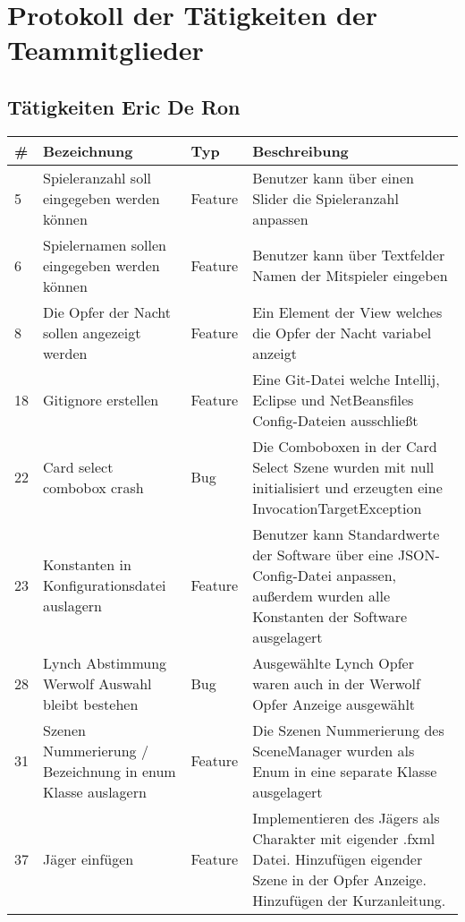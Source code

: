 \chapter{Protokoll der Tätigkeiten der Teammitglieder}

\section{Tätigkeiten Eric De Ron}

\begin{tabularx}{\textwidth}{|l|p{4.5cm}|l|X|}
	\hline                                             %
	\textbf{\#}  &    \textbf{Bezeichnung}  &    \textbf{Typ}  & \textbf{Beschreibung}	 \\ 
	\hline \hline 
	\endhead      
	
	5 \label{iss:5}	&	Spieleranzahl soll eingegeben werden können &	Feature	&	Benutzer kann über einen Slider die Spieleranzahl anpassen  \\ \hline
	6 \label{iss:6}	&	Spielernamen sollen eingegeben werden können    &	Feature	&	Benutzer kann über Textfelder Namen der Mitspieler eingeben  \\ \hline
	8 \label{iss:8}	&	Die Opfer der Nacht sollen angezeigt werden &	Feature	&	Ein Element der View welches die Opfer der Nacht variabel anzeigt  \\ \hline
	18 \label{iss:18}	&	Gitignore erstellen &	Feature	&	Eine Git-Datei welche Intellij, Eclipse und NetBeansfiles Config-Dateien ausschließt  \\ \hline
	22 \label{iss:22}	&	Card select combobox crash  &	Bug	&	Die Comboboxen in der Card Select Szene wurden mit null initialisiert und erzeugten eine InvocationTargetException  \\ \hline
	23 \label{iss:23}	&	Konstanten in Konfigurationsdatei auslagern &	Feature	&	Benutzer kann Standardwerte der Software über eine JSON-Config-Datei anpassen, außerdem wurden alle Konstanten der Software ausgelagert  \\ \hline
	28 \label{iss:28}	&	Lynch Abstimmung Werwolf Auswahl bleibt bestehen	&	Bug	&	Ausgewählte Lynch Opfer waren auch in der Werwolf Opfer Anzeige ausgewählt  \\ \hline
	31 \label{iss:31}	&	Szenen Nummerierung / Bezeichnung in enum Klasse auslagern	&	Feature	&	Die Szenen Nummerierung des SceneManager wurden als Enum in eine separate Klasse ausgelagert  \\ \hline
	37 \label{iss:37}	&	Jäger einfügen	&	Feature	&	Implementieren des Jägers als Charakter mit eigender .fxml Datei. Hinzufügen eigender Szene in der Opfer Anzeige. Hinzufügen der Kurzanleitung.  \\ \hline

\end{tabularx}
